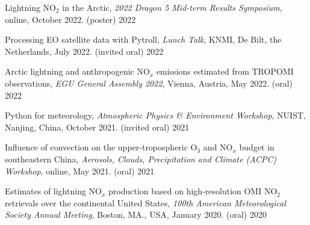 

\begin{cvpublications}

\publication
{Lightning NO$_2$ in the Arctic,
\emph{2022 Dragon 5 Mid-term Results Symposium},
online, October 2022. (poster)} %
{2022} %

\publication
{Processing EO satellite data with Pytroll,
\emph{Lunch Talk},
KNMI, De Bilt, the Netherlands, July 2022. (invited oral)} %
{2022} %

\publication
{Arctic lightning and anthropogenic NO$_x$ emissions estimated from TROPOMI observations,
\emph{EGU General Assembly 2022},
Vienna, Austria, May 2022. (oral)} %
{2022} %

\publication
{Python for meteorology,
\emph{Atmospheric Physics \& Environment Workshop},
NUIST, Nanjing, China, October 2021. (invited oral)} %
{2021} %

\publication
{Influence of convection on the upper-tropospheric O$_3$ and NO$_x$ budget in southeastern China,
\emph{Aerosols, Clouds, Precipitation and Climate (ACPC) Workshop},
online, May 2021. (oral)} %
{2021} %


\publication
{Estimates of lightning NO$_x$ production based on high-resolution OMI NO$_2$ retrievals over the continental United States,
\emph{100th American Meteorological Society Annual Meeting},
Boston, MA., USA, January 2020. (oral)} %
{2020} %



\end{cvpublications}
